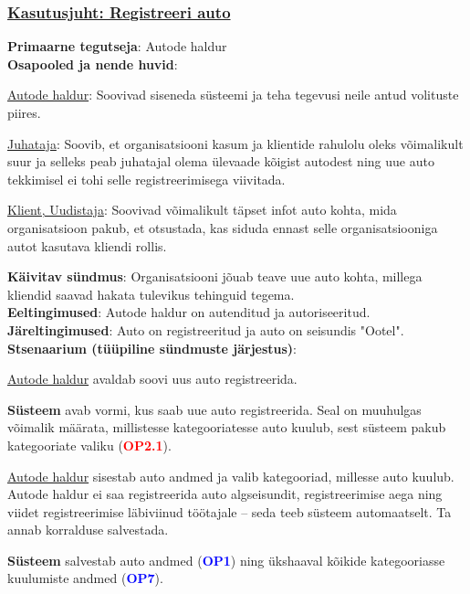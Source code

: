 \begin{shaded}
	\subsubsection{\underline{Kasutusjuht: Registreeri auto}}
	\textbf{Primaarne tegutseja}: Autode haldur \\
	\textbf{Osapooled ja nende huvid}: 
		\useDash
		\begin{myitemize}
		\item \underline{Autode haldur}: Soovivad siseneda süsteemi ja teha tegevusi neile antud volituste piires.
		\item \underline{Juhataja}: Soovib, et organisatsiooni kasum ja klientide rahulolu oleks võimalikult suur ja selleks peab juhatajal olema ülevaade kõigist autodest ning uue auto tekkimisel ei tohi selle registreerimisega viivitada.
		\item \underline{Klient, Uudistaja}: Soovivad võimalikult täpset infot auto kohta, mida organisatsioon pakub, et otsustada, kas siduda ennast selle organisatsiooniga autot kasutava kliendi rollis.
		\end{myitemize}
	\textbf{Käivitav sündmus}: Organisatsiooni jõuab teave uue auto kohta, millega kliendid saavad hakata tulevikus tehinguid tegema. \\
	\textbf{Eeltingimused}: Autode haldur on autenditud ja autoriseeritud. \\
	\textbf{Järeltingimused}: Auto on registreeritud ja auto on seisundis "Ootel". \\
	\textbf{Stsenaarium (tüüpiline sündmuste järjestus)}:
	\begin{myenumerate}
		\item \underline{Autode haldur} avaldab soovi uus auto registreerida.
		\item \textbf{Süsteem} avab vormi, kus saab uue auto registreerida. Seal on muuhulgas võimalik määrata, millistesse kategooriatesse auto kuulub, sest süsteem pakub kategooriate valiku (\textbf{\textcolor{red}{OP2.1}}).
		\item \underline{Autode haldur} sisestab auto andmed ja valib kategooriad, millesse auto kuulub. Autode haldur ei saa registreerida auto algseisundit, registreerimise aega ning viidet registreerimise läbiviinud töötajale – seda teeb süsteem automaatselt. Ta annab korralduse salvestada.
		\item \textbf{Süsteem} salvestab auto andmed (\textbf{\textcolor{blue}{OP1}}) ning ükshaaval kõikide kategooriasse kuulumiste andmed (\textbf{\textcolor{blue}{OP7}}).

\end{myenumerate}
\end{shaded}
